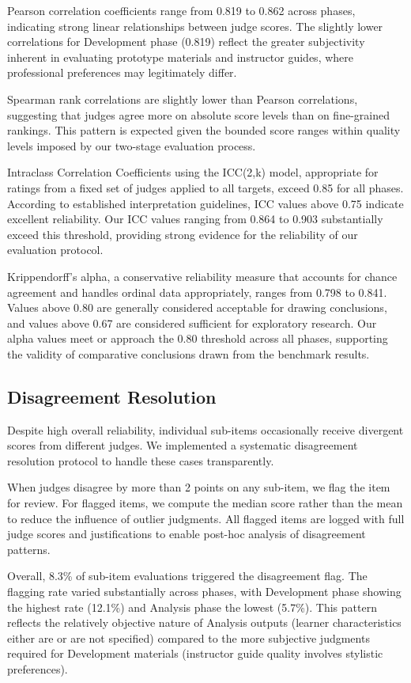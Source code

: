 Pearson correlation coefficients range from 0.819 to 0.862 across phases, indicating strong linear relationships between judge scores. The slightly lower correlations for Development phase (0.819) reflect the greater subjectivity inherent in evaluating prototype materials and instructor guides, where professional preferences may legitimately differ.

Spearman rank correlations are slightly lower than Pearson correlations, suggesting that judges agree more on absolute score levels than on fine-grained rankings. This pattern is expected given the bounded score ranges within quality levels imposed by our two-stage evaluation process.

Intraclass Correlation Coefficients using the ICC(2,k) model, appropriate for ratings from a fixed set of judges applied to all targets, exceed 0.85 for all phases. According to established interpretation guidelines, ICC values above 0.75 indicate excellent reliability. Our ICC values ranging from 0.864 to 0.903 substantially exceed this threshold, providing strong evidence for the reliability of our evaluation protocol.

Krippendorff's alpha, a conservative reliability measure that accounts for chance agreement and handles ordinal data appropriately, ranges from 0.798 to 0.841. Values above 0.80 are generally considered acceptable for drawing conclusions, and values above 0.67 are considered sufficient for exploratory research. Our alpha values meet or approach the 0.80 threshold across all phases, supporting the validity of comparative conclusions drawn from the benchmark results.

\subsection{Disagreement Resolution}

Despite high overall reliability, individual sub-items occasionally receive divergent scores from different judges. We implemented a systematic disagreement resolution protocol to handle these cases transparently.

When judges disagree by more than 2 points on any sub-item, we flag the item for review. For flagged items, we compute the median score rather than the mean to reduce the influence of outlier judgments. All flagged items are logged with full judge scores and justifications to enable post-hoc analysis of disagreement patterns.

Overall, 8.3\% of sub-item evaluations triggered the disagreement flag. The flagging rate varied substantially across phases, with Development phase showing the highest rate (12.1\%) and Analysis phase the lowest (5.7\%). This pattern reflects the relatively objective nature of Analysis outputs (learner characteristics either are or are not specified) compared to the more subjective judgments required for Development materials (instructor guide quality involves stylistic preferences).

